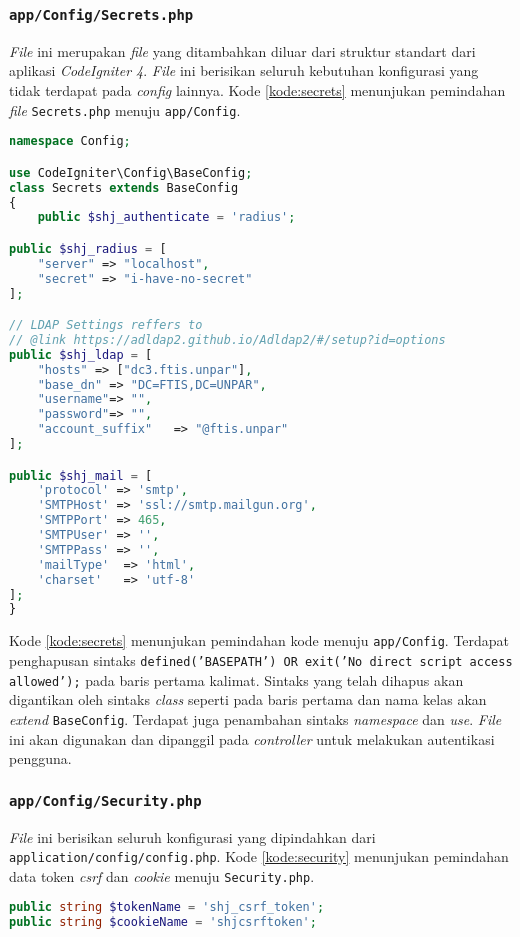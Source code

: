 \subsubsection{\texttt{app/Config/Secrets.php}}
\textit{File} ini merupakan \textit{file} yang ditambahkan diluar dari struktur standart dari aplikasi \textit{CodeIgniter 4}. \textit{File} ini berisikan seluruh kebutuhan konfigurasi yang tidak terdapat pada \textit{config} lainnya. Kode \ref{kode:secrets} menunjukan pemindahan \textit{file} \texttt{Secrets.php} menuju \texttt{app/Config}.
\begin{lstlisting}[language=PHP, caption=Penambahan \textit{file} \textit{secrets}, label=kode:secrets]
namespace Config;

use CodeIgniter\Config\BaseConfig;
class Secrets extends BaseConfig
{ 
	public $shj_authenticate = 'radius';

public $shj_radius = [
    "server" => "localhost",
    "secret" => "i-have-no-secret"
];

// LDAP Settings reffers to
// @link https://adldap2.github.io/Adldap2/#/setup?id=options
public $shj_ldap = [
    "hosts" => ["dc3.ftis.unpar"],
    "base_dn" => "DC=FTIS,DC=UNPAR",
    "username"=> "",
    "password"=> "",
    "account_suffix"   => "@ftis.unpar"
];

public $shj_mail = [
    'protocol' => 'smtp',
    'SMTPHost' => 'ssl://smtp.mailgun.org',
    'SMTPPort' => 465,
    'SMTPUser' => '',
    'SMTPPass' => '',
    'mailType'  => 'html',
    'charset'   => 'utf-8'
];
}
\end{lstlisting}

Kode \ref{kode:secrets} menunjukan pemindahan kode menuju \texttt{app/Config}. Terdapat penghapusan sintaks \texttt{defined('BASEPATH') OR exit('No direct script access allowed');} pada baris pertama kalimat. Sintaks yang telah dihapus akan digantikan oleh sintaks \textit{class} seperti pada baris pertama dan nama kelas akan \textit{extend} \texttt{BaseConfig}. Terdapat juga penambahan sintaks \textit{namespace} dan \textit{use}. \textit{File} ini akan digunakan dan dipanggil pada \textit{controller} untuk melakukan autentikasi pengguna.

\subsubsection{\texttt{app/Config/Security.php}}
\textit{File} ini berisikan seluruh konfigurasi yang dipindahkan dari \texttt{application/config/config.php}. Kode \ref{kode:security} menunjukan pemindahan data token \textit{csrf} dan \textit{cookie} menuju \texttt{Security.php}.
\begin{lstlisting}[language=PHP, caption=Pemindahan \textit{file} \textit{config} menuju \texttt{Security.php}, label=kode:security]
public string $tokenName = 'shj_csrf_token';
public string $cookieName = 'shjcsrftoken';
\end{lstlisting}

